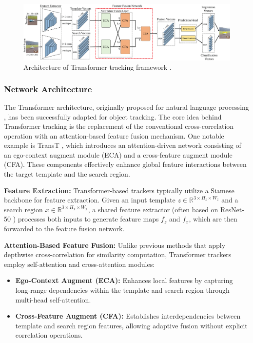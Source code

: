 \begin{figure}[ht]
    \centering
    \includegraphics[width=1\linewidth]{images/vitt_architecture.png}
    \caption{Architecture of Transformer tracking framework \cite{chen2021transformer}.}
    \label{fig:transt_architecture}
\end{figure}

\subsubsection{Network Architecture} 
The Transformer architecture, originally proposed for natural language processing \cite{vaswani2017attention}, has been successfully adapted for object tracking. The core idea behind Transformer tracking is the replacement of the conventional cross-correlation operation with an attention-based feature fusion mechanism. One notable example is TransT \cite{chen2021transformer}, which introduces an attention-driven network consisting of an ego-context augment module (ECA) and a cross-feature augment module (CFA). These components effectively enhance global feature interactions between the target template and the search region.


\textbf{Feature Extraction:} Transformer-based trackers typically utilize a Siamese backbone for feature extraction. Given an input template $z \in \mathbb{R}^{3 \times H_z \times W_z}$ and a search region $x \in \mathbb{R}^{3 \times H_x \times W_x}$, a shared feature extractor (often based on ResNet-50 \cite{he2016deep}) processes both inputs to generate feature maps $f_z$ and $f_x$, which are then forwarded to the feature fusion network.

\textbf{Attention-Based Feature Fusion: }Unlike previous methods that apply depthwise cross-correlation for similarity computation, Transformer trackers employ self-attention and cross-attention modules:
\begin{itemize}
    \item \textbf{Ego-Context Augment (ECA):} Enhances local features by capturing long-range dependencies within the template and search region through multi-head self-attention.
    \item \textbf{Cross-Feature Augment (CFA):} Establishes interdependencies between template and search region features, allowing adaptive fusion without explicit correlation operations.
\end{itemize}

